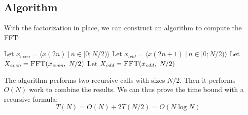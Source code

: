 \subsection{Algorithm}
With the factorization in place,
we can construct an algorithm to compute the FFT:

\begin{algorithm}[H]
    \DontPrintSemicolon
    \caption{$\textsc{FFT}(x, N)$}
    Let $x_\textit{even} = \langle x(2n) ~|~ n \in [0;N/2) \rangle$\;
    Let $x_\textit{odd} = \langle x(2n + 1) ~|~ n \in [0;N/2) \rangle$\;
    Let $X_\textit{even} = \textsc{FFT}(x_\textit{even}, ~N/2)$\;
    Let $X_\textit{odd} = \textsc{FFT}(x_\textit{odd}, ~N/2)$\;
\end{algorithm}

The algorithm performs two recursive calls with sizes $N/2$.
Then it performs $O(N)$ work to combine the results.
We can thus prove the time bound with a recursive formula:
\begin{equation}
    T(N) = O(N) + 2T(N/2) = O(N \log N)
\end{equation}
